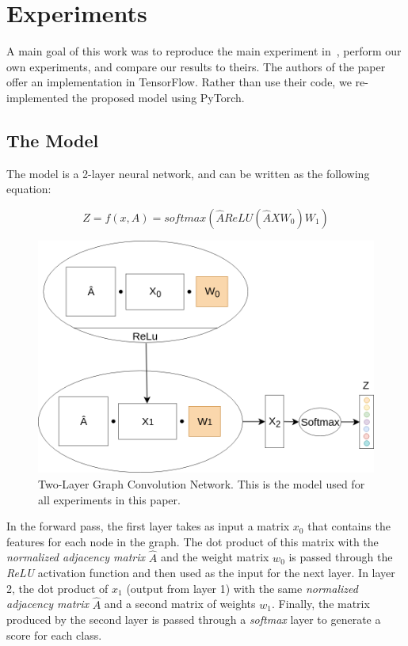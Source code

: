 \section{Experiments}

A main goal of this work was to reproduce the main experiment in~\cite{Kipf2016}, perform our own experiments, and compare our results to theirs. The authors of the paper offer an implementation in TensorFlow. Rather than use their code, we re-implemented the proposed model using PyTorch. 

\subsection{The Model}
The model is a 2-layer neural network, and can be written as the following equation:

\begin{equation}
    \label{eq:model}
    Z = f(x,A) = softmax(\hat{A}ReLU(\hat{A}XW_{0})W_{1}) 
\end{equation}

\begin{figure}[h!]
  \centering
  \includegraphics[width=0.75\linewidth]{media/model_right.png}
  
  \caption{Two-Layer Graph Convolution Network. This is the model used for all experiments in this paper.}
  \label{fig:model}
\end{figure}

In the forward pass, the first layer takes as input a matrix $x_{0}$ that contains the features for each node in the graph. The dot product of this matrix with the \textit{normalized adjacency matrix} $\hat{A}$ and the weight matrix $w_{0}$ is passed through the \textit{ReLU} activation function and then used as the input for the next layer. In layer 2, the dot product of $x_{1}$ (output from layer 1) with the same \textit{normalized adjacency matrix} $\hat{A}$ and a second matrix of weights $w_{1}$. Finally, the matrix produced by the second layer is passed through a \textit{softmax} layer to generate a score for each class.

